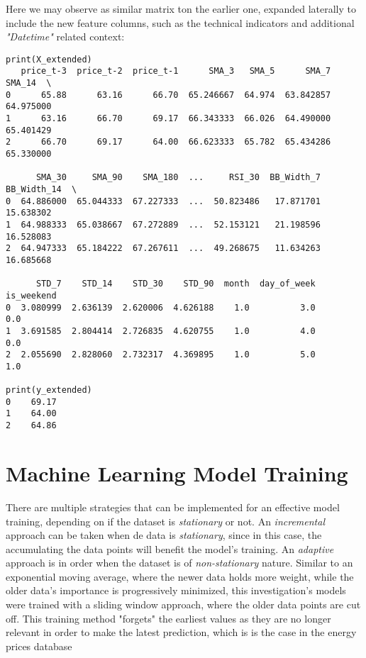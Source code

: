 \documentclass[12pt]{report} %
\begin{document}
Here we may observe as similar matrix ton the earlier one, expanded laterally to include the new feature columns, such as the technical indicators and additional \textit{"Datetime"} related context:
\begin{small}
\begin{verbatim}
print(X_extended)
   price_t-3  price_t-2  price_t-1      SMA_3   SMA_5      SMA_7     SMA_14  \
0      65.88      63.16      66.70  65.246667  64.974  63.842857  64.975000   
1      63.16      66.70      69.17  66.343333  66.026  64.490000  65.401429   
2      66.70      69.17      64.00  66.623333  65.782  65.434286  65.330000   

      SMA_30     SMA_90    SMA_180  ...     RSI_30  BB_Width_7  BB_Width_14  \
0  64.886000  65.044333  67.227333  ...  50.823486   17.871701    15.638302   
1  64.988333  65.038667  67.272889  ...  52.153121   21.198596    16.528083   
2  64.947333  65.184222  67.267611  ...  49.268675   11.634263    16.685668   

      STD_7    STD_14    STD_30    STD_90  month  day_of_week  is_weekend  
0  3.080999  2.636139  2.620006  4.626188    1.0          3.0         0.0  
1  3.691585  2.804414  2.726835  4.620755    1.0          4.0         0.0  
2  2.055690  2.828060  2.732317  4.369895    1.0          5.0         1.0

print(y_extended)
0    69.17
1    64.00
2    64.86
\end{verbatim}
\end{small}


\section{Machine Learning Model Training}

There are multiple strategies that can be implemented for an effective model training, depending on if the dataset is \textit{stationary} or not. An \textit{incremental} approach can be taken when de data is  \textit{stationary}, since in this case, the accumulating the data points will benefit the model's training. An \textit{adaptive} approach is in order when the dataset is of \textit{non-stationary} nature. Similar to an exponential moving average, where the newer data holds more weight, while the older data's importance is progressively minimized, this investigation's models were trained with a sliding window approach, where the older data points are cut off. This training method "forgets" the earliest values as they are no longer relevant in order to make the latest prediction, which is is the case in the energy prices database
\end{document}
